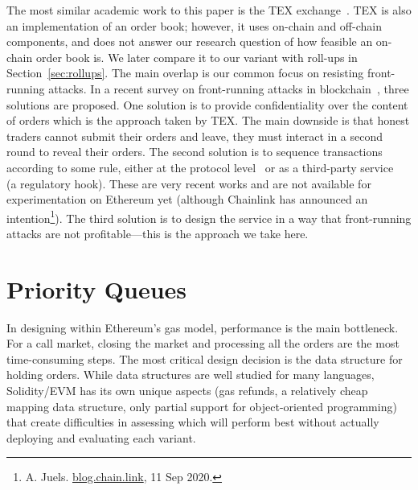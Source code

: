 The most similar academic work to this paper is the TEX exchange~\cite{khalil2019tex}. TEX is also an implementation of an order book; however, it uses on-chain and off-chain components, and does not answer our research question of how feasible an on-chain order book is. We later compare it to our variant with roll-ups in Section~\ref{sec:rollups}. The main overlap is our common focus on resisting front-running attacks. In a recent survey on front-running attacks in blockchain~\cite{eskandari2019sok}, three solutions are proposed. One solution is to provide confidentiality over the content of orders which is the approach taken by TEX. The main downside is that honest traders cannot submit their orders and leave, they must interact in a second round to reveal their orders. The second solution is to sequence transactions according to some rule, either at the protocol level~\cite{MZGA20} or as a third-party service~\cite{Kla20} (a regulatory hook). These are very recent works and are not available for experimentation on Ethereum yet (although Chainlink has announced an intention\footnote{A. Juels. \href{https://blog.chain.link/chainlink-fair-sequencing-services-enabling-a-provably-fair-defi-ecosystem/}{blog.chain.link}, 11 Sep 2020.}). The third solution is to design the service in a way that front-running attacks are not profitable---this is the approach we take here. 



\section{Priority Queues}\label{sec:pq}



In designing \cm within Ethereum's gas model, performance is the main bottleneck. For a call market, closing the market and processing all the orders are the most time-consuming steps. The most critical design decision is the data structure for holding orders. While data structures are well studied for many languages, Solidity/EVM has its own unique aspects (\eg gas refunds, a relatively cheap mapping data structure, only partial support for object-oriented programming) that create difficulties in assessing which will perform best without actually deploying and evaluating each variant. 

